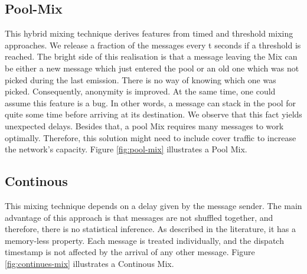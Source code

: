 \documentclass[logo,msc,cyber]{infthesis}   %
\begin{document}
\subsection{Pool-Mix}
This hybrid mixing technique\cite{diaz2003generalising} derives features from
timed and threshold mixing approaches. We release a fraction of the messages
every t seconds if a threshold is reached. The bright side of this realisation
is that a message leaving the Mix can be either a new message which just entered
the pool or an old one which was not picked during the last emission. There is
no way of knowing which one was picked. Consequently, anonymity is improved. At
the same time, one could assume this feature is a bug. In other words, a message
can stack in the pool for quite some time before arriving at its destination. We
observe that this fact yields unexpected delays. Besides that, a pool Mix
requires many messages to work optimally. Therefore, this solution might need to
include cover traffic to increase the network's capacity. Figure
\ref{fig:pool-mix} illustrates a Pool Mix.

\subsection{Continous}
This mixing technique depends on a delay given by the message
sender\cite{kesdogan1998stop}. The main advantage of this approach is that
messages are not shuffled together, and therefore, there is no statistical
inference. As described in the literature, it has a memory-less
property\cite{piotrowska2017loopix}. Each message is treated individually, and
the dispatch timestamp is not affected by the arrival of any other message.
Figure \ref{fig:continues-mix} illustrates a Continous Mix.
\end{document}
